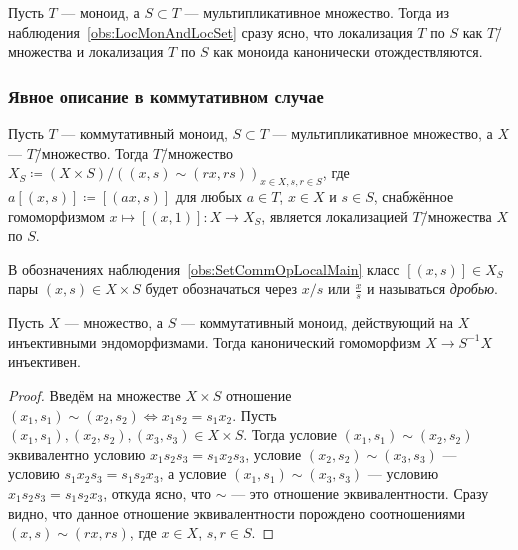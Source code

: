 \documentclass[
	extrafontsizes,
	11pt,
	hyphens,
]{memoir}
\begin{document}
\begin{observation}
Пусть \(T\) --- моноид, а \(S \subset T\) --- мультипликативное множество.
Тогда из наблюдения~\ref{obs:LocMonAndLocSet} сразу ясно, что локализация \(T\) по \(S\) как \(T\)\=/множества и локализация \(T\) по \(S\) как моноида канонически отождествляются.
\end{observation}

\subsubsection{Явное описание в коммутативном случае}

\begin{observation}
Пусть \(T\) --- коммутативный моноид, \(S \subset T\) --- мультипликативное множество, а \(X\) --- \(T\)\=/множество.%
\label{obs:SetCommOpLocalMain}
Тогда \(T\)\=/множество
\(X_S \coloneqq (X \times S) / ((x, s) \sim (rx,rs))_{x \in X, s,r \in S}\),
где \(a[(x, s)] \coloneqq [(ax, s)]\) для любых \(a \in T\), \(x \in X\) и \(s \in S\), снабжённое гомоморфизмом \(x \mapsto [(x,1)] : X \to X_S\),
является локализацией \(T\)\=/множества \(X\) по \(S\).
\end{observation}

\begin{notation}
В обозначениях наблюдения~\ref{obs:SetCommOpLocalMain} класс \([(x, s)] \in X_S\) пары \((x, s) \in X \times S\) будет обозначаться через \(x/s\) или \(\frac{x}{s}\) и называться \emph{дробью}.
\end{notation}

\begin{lemma}
Пусть \(X\) --- множество, а \(S\) --- коммутативный моноид, действующий на \(X\) инъективными эндоморфизмами.%
\label{lem:CommLocSetMainInj}
Тогда канонический гомоморфизм \(X \to S^{-1}X\) инъективен.
\end{lemma}

\begin{proof}
Введём на множестве \(X \times S\) отношение \((x_1, s_1) \sim (x_2, s_2) \iff x_1 s_2 = s_1 x_2\).
Пусть \((x_1, s_1), (x_2, s_2), (x_3, s_3) \in X \times S\). Тогда условие \((x_1, s_1) \sim (x_2, s_2)\) эквивалентно условию \(x_1 s_2 s_3 = s_1 x_2 s_3\), условие \((x_2, s_2) \sim (x_3, s_3)\) --- условию \(s_1 x_2 s_3 = s_1 s_2 x_3\), а условие \((x_1, s_1) \sim (x_3, s_3)\) --- условию \(x_1 s_2 s_3 = s_1 s_2 x_3\), откуда ясно, что \(\sim\) --- это отношение эквивалентности.
Сразу видно, что данное отношение эквивалентности порождено соотношениями \((x, s) \sim (rx,rs)\), где \(x \in X\), \(s,r \in S\).
\end{proof}
\end{document}
